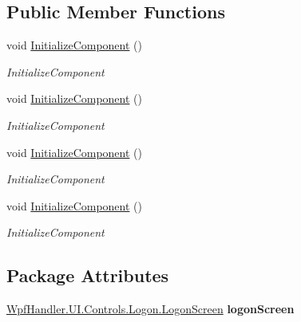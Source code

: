 \subsection*{Public Member Functions}
\begin{DoxyCompactItemize}
\item 
void \mbox{\hyperlink{class_logon_screen_1_1_main_window_aa3160f45c3fce3de08435e056390a1b4}{Initialize\+Component}} ()
\begin{DoxyCompactList}\small\item\em Initialize\+Component \end{DoxyCompactList}\item 
void \mbox{\hyperlink{class_logon_screen_1_1_main_window_aa3160f45c3fce3de08435e056390a1b4}{Initialize\+Component}} ()
\begin{DoxyCompactList}\small\item\em Initialize\+Component \end{DoxyCompactList}\item 
void \mbox{\hyperlink{class_logon_screen_1_1_main_window_aa3160f45c3fce3de08435e056390a1b4}{Initialize\+Component}} ()
\begin{DoxyCompactList}\small\item\em Initialize\+Component \end{DoxyCompactList}\item 
void \mbox{\hyperlink{class_logon_screen_1_1_main_window_aa3160f45c3fce3de08435e056390a1b4}{Initialize\+Component}} ()
\begin{DoxyCompactList}\small\item\em Initialize\+Component \end{DoxyCompactList}\end{DoxyCompactItemize}
\subsection*{Package Attributes}
\begin{DoxyCompactItemize}
\item 
\mbox{\label{class_logon_screen_1_1_main_window_a88cd84a9c036484e10af1e043bb643d0}} 
\mbox{\hyperlink{class_wpf_handler_1_1_u_i_1_1_controls_1_1_logon_1_1_logon_screen}{Wpf\+Handler.\+U\+I.\+Controls.\+Logon.\+Logon\+Screen}} {\bfseries logon\+Screen}
\end{DoxyCompactItemize}
